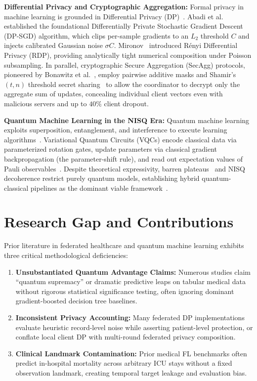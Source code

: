 \documentclass[conference]{IEEEtran}
\begin{document}
\textbf{Differential Privacy and Cryptographic Aggregation:} Formal privacy in machine learning is grounded in Differential Privacy (DP)~\cite{dwork2006calibrating}. Abadi et al.~\cite{abadi2016deep} established the foundational Differentially Private Stochastic Gradient Descent (\textsf{DP-SGD}) algorithm, which clips per-sample gradients to an $L_2$ threshold $C$ and injects calibrated Gaussian noise $\sigma C$. Mironov~\cite{mironov2017renyi} introduced Rényi Differential Privacy (RDP), providing analytically tight numerical composition under Poisson subsampling. In parallel, cryptographic Secure Aggregation (\textsf{SecAgg}) protocols, pioneered by Bonawitz et al.~\cite{bonawitz2017practical}, employ pairwise additive masks and Shamir's $(t, n)$ threshold secret sharing~\cite{shamir1979share} to allow the coordinator to decrypt only the aggregate sum of updates, concealing individual client vectors even with malicious servers and up to $40\%$ client dropout.

\textbf{Quantum Machine Learning in the NISQ Era:} Quantum machine learning exploits superposition, entanglement, and interference to execute learning algorithms~\cite{biamonte2017quantum,cerezo2021variational}. Variational Quantum Circuits (VQCs) encode classical data via parameterized rotation gates, update parameters via classical gradient backpropagation (the parameter-shift rule), and read out expectation values of Pauli observables~\cite{bergholm2018pennylane,schuld2019evaluating}. Despite theoretical expressivity, barren plateaus~\cite{mcclean2018barren} and NISQ decoherence restrict purely quantum models, establishing hybrid quantum-classical pipelines as the dominant viable framework~\cite{chen2021federated}.

\section{Research Gap and Contributions}
Prior literature in federated healthcare and quantum machine learning exhibits three critical methodological deficiencies:
\begin{enumerate}
    \item \textbf{Unsubstantiated Quantum Advantage Claims:} Numerous studies claim ``quantum supremacy'' or dramatic predictive leaps on tabular medical data without rigorous statistical significance testing, often ignoring dominant gradient-boosted decision tree baselines.
    \item \textbf{Inconsistent Privacy Accounting:} Many federated DP implementations evaluate heuristic record-level noise while asserting patient-level protection, or conflate local client DP with multi-round federated privacy composition.
    \item \textbf{Clinical Landmark Contamination:} Prior medical FL benchmarks often predict in-hospital mortality across arbitrary ICU stays without a fixed observation landmark, creating temporal target leakage and evaluation bias.
\end{enumerate}
\end{document}
